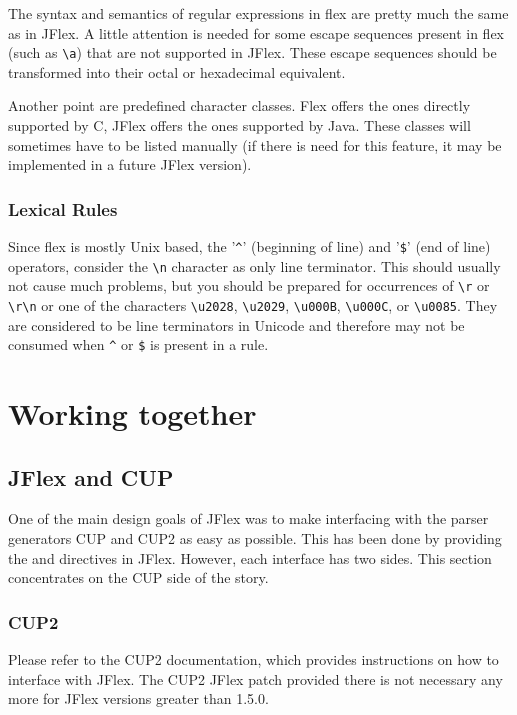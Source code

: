 \documentclass[11pt]{scrartcl}
\begin{document}
The syntax and semantics of regular expressions in flex are pretty much the
same as in JFlex. A little attention is needed for some escape sequences 
present in flex (such as \verb+\a+) that are not supported in JFlex. These
escape sequences should be transformed into their octal or hexadecimal 
equivalent. 

Another point are predefined character classes. Flex offers the ones directly
supported by C, JFlex offers the ones supported by Java. These classes will
sometimes have to be listed manually (if there is need for this feature, it
may be implemented in a future JFlex version).

\subsubsection{Lexical Rules}
Since flex is mostly Unix based, the '\verb+^+' (beginning of line) and
'\verb+$+' (end of line) operators, consider the \verb+\n+ character as %
only line terminator. This should usually not cause much problems, but you
should be prepared for occurrences of \verb+\r+ or \verb+\r\n+ or one of
the characters \verb+\u2028+, \verb+\u2029+, \verb+\u000B+, \verb+\u000C+, 
or \verb+\u0085+. They are considered to be line terminators in Unicode and 
therefore may not be consumed when 
\verb+^+ or \verb+$+ is present in a rule.%

\section{Working together}\label{WorkingTog}

\subsection{JFlex and CUP}\label{CUPWork}

One of the main design goals of JFlex was to make interfacing with the parser generators
CUP \cite{CUP} and CUP2 \cite{CUP2} as easy as possible. This has been done by providing
the \texttt{} and \texttt{} directives
in JFlex. However, each interface has two sides. This section concentrates on the CUP
side of the story.

\subsubsection{CUP2}
Please refer to the CUP2 \cite{CUP2} documentation, which provides
instructions on how to interface with JFlex. The CUP2 JFlex patch
provided there is not necessary any more for JFlex versions greater
than 1.5.0.
\end{document}
